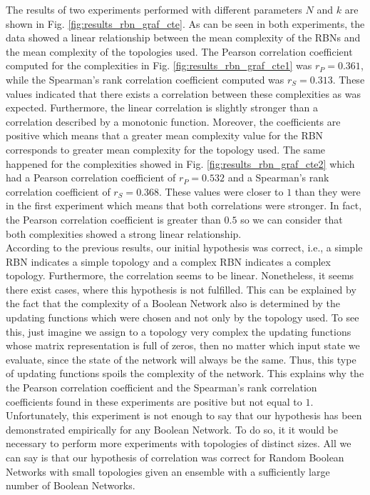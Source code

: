 The results of two experiments performed with different parameters $N$ and $k$ are shown in Fig. \ref{fig:results_rbn_graf_cte}. As can be seen in both experiments, the data showed a linear relationship between the mean complexity of the RBNs and the mean complexity of the topologies used. The Pearson correlation coefficient computed for the complexities in Fig. \ref{fig:results_rbn_graf_cte1} was $r_{P} =0.361$, while the Spearman's rank correlation coefficient computed was $r_{S} =0.313$. These values indicated that there exists a correlation between these complexities as was expected. Furthermore, the linear correlation is slightly stronger than a correlation described by a monotonic function. Moreover, the coefficients are positive which means that a greater mean complexity value for the RBN corresponds to greater mean complexity for the topology used. The same happened for the complexities showed in Fig. \ref{fig:results_rbn_graf_cte2} which had a Pearson correlation coefficient of $r_{P} =0.532$ and a Spearman's rank correlation coefficient of $r_{S} =0.368$. These values were closer to $1$ than they were in the first experiment which means that both correlations were stronger. In fact, the Pearson correlation coefficient is greater than $0.5$ so we can consider that both complexities showed a strong linear relationship.\\

According to the previous results, our initial hypothesis was correct, i.e., a simple RBN indicates a simple topology and a complex RBN indicates a complex topology. Furthermore, the correlation seems to be linear. Nonetheless, it seems there exist cases, where this hypothesis is not fulfilled. This can be explained by the fact that the complexity of a Boolean Network also is determined by the updating functions which were chosen and not only by the topology used. To see this, just imagine we assign to a topology very complex the updating functions whose matrix representation is full of zeros, then no matter which input state we evaluate, since the state of the network will always be the same. Thus, this type of updating functions spoils the complexity of the network. This explains why the the Pearson correlation coefficient and the Spearman's rank correlation coefficients found in these experiments are positive but not equal to $1$. Unfortunately, this experiment is not enough to say that our hypothesis has been demonstrated empirically for any Boolean Network. To do so, it it would be necessary to perform more experiments with topologies of distinct sizes. All we can say is that our hypothesis of correlation was correct for Random Boolean Networks with small topologies given an ensemble with a sufficiently large number of Boolean Networks.\\

